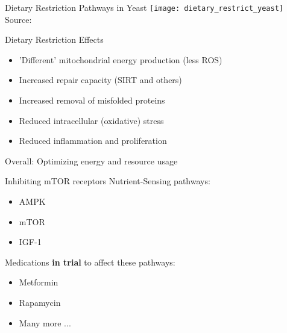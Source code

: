 \begin{frame}[c]{Dietary Restriction Pathways in Yeast}
    \texttt{[image: dietary\_restrict\_yeast]} \\
    Source: \cite{kapahi2017dietary}
\end{frame}


\begin{frame}[c]{Dietary Restriction Effects}
    \large
    \begin{itemize}[<+(1)->]
        \item 'Different' mitochondrial energy production (less ROS)
        \item Increased repair capacity (SIRT and others)
        \item Increased removal of misfolded proteins
        \item Reduced intracellular (oxidative) stress
        \item Reduced inflammation and proliferation
    \end{itemize}
    Overall: Optimizing energy and resource usage
\end{frame}


\begin{frame}[c]{Inhibiting mTOR receptors}
    \large
    Nutrient-Sensing pathways:
    \begin{itemize}[<+(1)->]
        \item AMPK
        \item mTOR
        \item IGF-1
    \end{itemize}

    \pause
    Medications \textbf{in trial} to affect these pathways:
    \begin{itemize}[<+(1)->]
        \item Metformin \cite{TAMETarg47:online}
        \item Rapamycin \cite{Particip66:online}
        \item Many more ...
    \end{itemize}
\end{frame}


